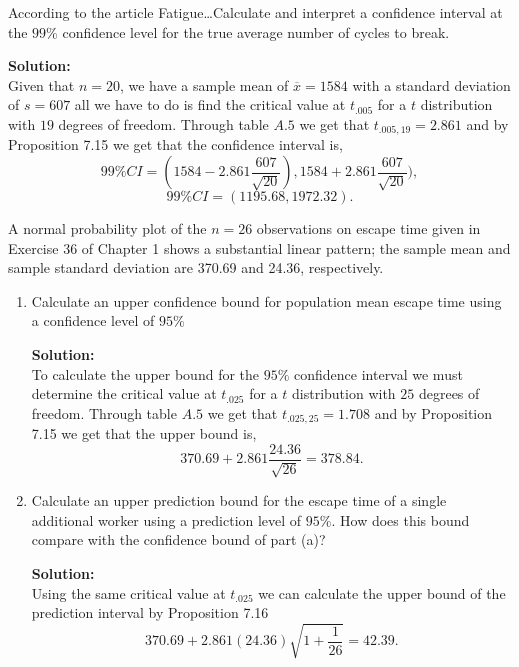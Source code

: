 \documentclass[12pt]{article}
\makeatletter
\theoremstyle{homework}
\newenvironment{exercise}[1]
{\def\@currentlabel{#1}\exercisecore}
{\endexercisecore}
\newcommand{\localhead}[1]{\par\smallskip\noindent\textbf{#1}\nobreak\\}%
\newcommand\solution{\localhead{Solution:}}
\makeatother
\begin{document}
\begin{exercise}{7.32}  According to the article Fatigue\dots Calculate and interpret a confidence interval 
  at the $99\%$ confidence level for the true average number of cycles to break.\\
\solution Given that $n = 20$, we have a sample mean of $\overline{x} = 1584$ with a standard deviation of $s = 607$
all we have to do is find the critical value at $t_{.005}$ for a $t$ distribution with $19$ degrees of freedom. Through table $A.5$ we get that 
$t_{.005,19} =2.861$ and by Proposition 7.15 we get that the confidence interval is,
\begin{equation*}
  99\% CI = (1584 - 2.861 \dfrac{607}{\sqrt{20}}),1584 + 2.861 \dfrac{607}{\sqrt{20}} ),
\end{equation*}
\begin{equation*}
  99\% CI = (1195.68, 1972.32).
\end{equation*}
\end{exercise}
\vspace{.5in}














\begin{exercise}{7.36} A normal probability plot of the $n = 26$ observations on escape  time  given  in  Exercise  36  of 
  Chapter  1  shows  a  substantial  linear  pattern;  the  sample  mean  and  sample  standard deviation are 370.69 and 24.36, 
  respectively.\\
  \begin{enumerate}
    \item  Calculate  an  upper  confidence  bound  for  population mean escape time using a confidence level of $95\%$\\
    \solution To calculate the upper bound for the $95\%$ confidence interval we must determine the critical value at $t_{.025}$ for a $t$ distribution with $25$ degrees of freedom.
    Through table $A.5$ we get that 
    $t_{.025,25} = 1.708$ and by Proposition 7.15 we get that the upper bound is,
    \begin{equation*}
      370.69 + 2.861 \dfrac{24.36}{\sqrt{26}} = 378.84.
    \end{equation*}

    \item  Calculate  an  upper  prediction  bound  for  the  escape  time of a single additional worker using a prediction level of $95\%$. 
    How does this bound compare with the confidence bound of part (a)?\\
    \solution Using the same critical value at $t_{.025}$ we can calculate the upper bound of the prediction interval by Proposition 7.16
    \begin{equation*}
      370.69 + 2.861(24.36) \sqrt{1 + \dfrac{1}{26}} = 42.39.
    \end{equation*}

  \end{enumerate}

\end{exercise}
\end{document}
